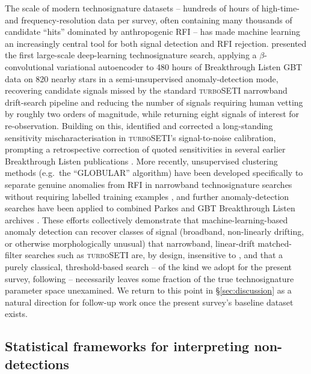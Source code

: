 \documentclass{openjournal}
\begin{document}
The scale of modern technosignature datasets -- hundreds of hours of
high-time- and frequency-resolution data per survey, often containing many
thousands of candidate ``hits'' dominated by anthropogenic RFI -- has made
machine learning an increasingly central tool for both signal detection and RFI
rejection. \citet{Ma2023} presented the first large-scale deep-learning
technosignature search, applying a $\beta$-convolutional variational autoencoder
to 480 hours of Breakthrough Listen GBT data on 820 nearby stars in a
semi-unsupervised anomaly-detection mode, recovering candidate signals missed by
the standard \textsc{turboSETI} narrowband drift-search pipeline
\citep{Enriquez2019} and reducing the number of signals requiring human vetting by
roughly two orders of magnitude, while returning eight signals of interest for
re-observation. Building on this, \citet{Choza2024} identified and corrected a
long-standing sensitivity mischaracterisation in \textsc{turboSETI}'s
signal-to-noise calibration, prompting a retrospective correction of quoted
sensitivities in several earlier Breakthrough Listen publications
\citep{GBTarchiveML2025}. More recently, unsupervised clustering methods (e.g.\
the ``GLOBULAR'' algorithm) have been developed specifically to separate genuine
anomalies from RFI in narrowband technosignature searches without requiring
labelled training examples \citep{GLOBULAR2025}, and further anomaly-detection
searches have been applied to combined Parkes and GBT Breakthrough Listen archives
\citep{AnomalyParkesGBT2025}. These efforts collectively demonstrate that
machine-learning-based anomaly detection can recover classes of signal
(broadband, non-linearly drifting, or otherwise morphologically unusual) that
narrowband, linear-drift matched-filter searches such as \textsc{turboSETI} are,
by design, insensitive to \citep{BRaTs2026}, and that a purely classical,
threshold-based search -- of the kind we adopt for the present survey, following
\citet{Mason2024} -- necessarily leaves some fraction of the true technosignature
parameter space unexamined. We return to this point in \S\ref{sec:discussion} as
a natural direction for follow-up work once the present survey's baseline dataset
exists.

\subsection{Statistical frameworks for interpreting non-detections}
\label{sec:stats}
\end{document}
